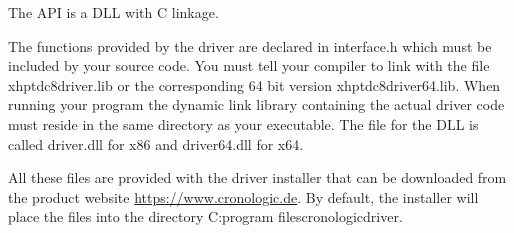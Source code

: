 
The API is a DLL with C linkage.\par

The functions provided by the driver are declared in \textsf{\tu interface.h} 
which must be included by your source code.
You must tell your compiler to link with the file \textsf{xhptdc8\tu driver.lib} 
or the corresponding 64 bit version \textsf{xhptdc8\tu driver\tu 64.lib}.
When running your program the dynamic link library containing the actual driver code must reside in the same directory as your executable. 
The file for the DLL is called \textsf{\prefix driver.dll} for x86 and \textsf{\prefix driver\tu 64.dll} for x64.

All these files are provided with the driver installer that can be downloaded from the product website \url{https://www.cronologic.de}. 
By default, the installer will place the files into the directory 
\textsf{C:\filesep program files\filesep cronologic\filesep \deviceName\filesep driver}.


 
